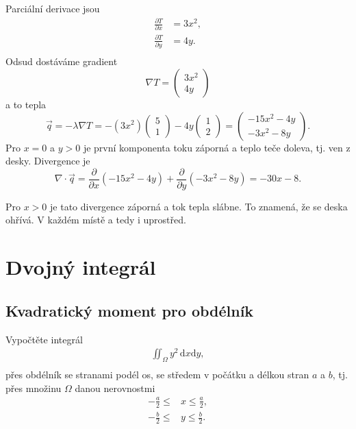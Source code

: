 \reseni

Parciální derivace jsou
$$
\begin{aligned}
  \frac{\partial T}{\partial x}&=3x^2,\\
  \frac{\partial T}{\partial y}&=4y.\\
\end{aligned}
$$
Odsud dostáváme gradient $$\nabla T=
\begin{pmatrix}
  3x^2 \\ 4y
\end{pmatrix}
$$
a to tepla
$$
\vec q=-\lambda \nabla T=-(3x^2)
\begin{pmatrix}
  5 \\ 1
\end{pmatrix}
-4y
\begin{pmatrix}
1\\2  
\end{pmatrix}
=
\begin{pmatrix}
  -15 x^2 -4y\\-3x^2-8y
\end{pmatrix}
.
$$
Pro $x=0$  a $y>0$ je první komponenta toku záporná a teplo teče doleva, tj. ven z desky.
Divergence je
$$\nabla \cdot\vec q=\frac{ \partial}{\partial x} (-15x^2-4y)+\frac{\partial }{\partial y}(-3x^2-8y) = -30x-8.$$

Pro $x>0$ je tato divergence záporná a tok tepla slábne. To znamená, že se deska ohřívá. V každém místě a tedy i uprostřed. 
\konec 


\stranka
\section{Dvojný integrál}

\subsection{Kvadratický moment pro obdélník}

Vypočtěte integrál
$$
\begin{aligned}
 \iint_\Omega y^2\,\mathrm dx \mathrm dy,\\
\end{aligned}
$$
přes obdélník se stranami podél os, se středem v počátku a délkou stran $a$ a $b$, tj. přes množinu $\Omega$ danou nerovnostmi
$$
\begin{aligned}
  -\frac a2\leq &x\leq \frac a2,\\
  -\frac b2\leq &y \leq \frac b2.
\end{aligned}
$$


